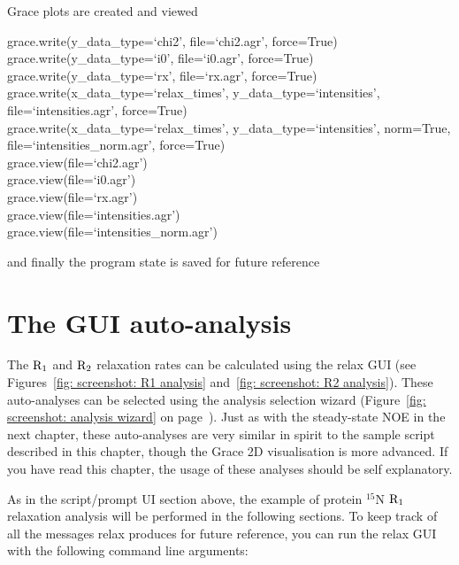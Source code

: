 Grace plots are created and viewed

\begin{exampleenv}
grace.write(y\_data\_type=`chi2', file=`chi2.agr', force=True) \\
grace.write(y\_data\_type=`i0', file=`i0.agr', force=True) \\
grace.write(y\_data\_type=`rx', file=`rx.agr', force=True) \\
grace.write(x\_data\_type=`relax\_times', y\_data\_type=`intensities', file=`intensities.agr', force=True) \\
grace.write(x\_data\_type=`relax\_times', y\_data\_type=`intensities', norm=True, file=`intensities\_norm.agr', force=True) \\
grace.view(file=`chi2.agr') \\
grace.view(file=`i0.agr') \\
grace.view(file=`rx.agr') \\
grace.view(file=`intensities.agr') \\
grace.view(file=`intensities\_norm.agr')
\end{exampleenv}

and finally the program state is saved for future reference





\newpage
\section{The GUI auto-analysis}

The $\mathrm{R}_1$ and $\mathrm{R}_2$ relaxation rates can be calculated using the relax GUI (see Figures~\ref{fig: screenshot: R1 analysis} and~\ref{fig: screenshot: R2 analysis}).  These auto-analyses can be selected using the analysis selection wizard (Figure~\ref{fig: screenshot: analysis wizard} on page~\pageref{fig: screenshot: analysis wizard}).  Just as with the steady-state NOE in the next chapter, these auto-analyses are very similar in spirit to the sample script described in this chapter, though the Grace 2D visualisation is more advanced.  If you have read this chapter, the usage of these analyses should be self explanatory.

As in the script/prompt UI section above, the example of protein $^{15}$N $\mathrm{R}_1$ relaxation analysis will be performed in the following sections.  To keep track of all the messages relax produces for future reference, you can run the relax GUI with the following command line arguments:

